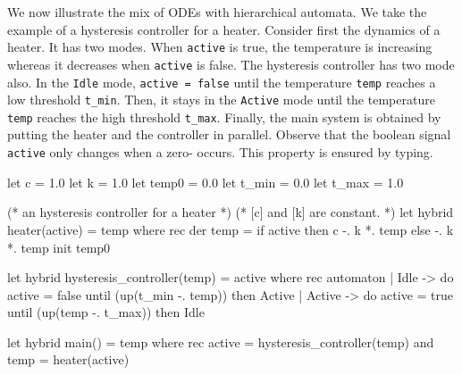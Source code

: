\documentclass[11pt,titlepage,twoside]{report}
\newcommand{\Marc}[1]{{\bf Marc.} {#1} {\bf Fin}}
\begin{document}
We now illustrate the mix of \acp{ODE} with hierarchical automata. We take
the example of a hysteresis controller for a heater.  Consider first
the dynamics of a heater. It has two modes. When \texttt{active} is true,
the temperature is increasing whereas it decreases when
\texttt{active} is false. The hysteresis controller has two mode also. In the
\texttt{Idle} mode, \texttt{active = false} until the temperature
\texttt{temp} reaches a low threshold \verb-t_min-. Then, it stays in
the \texttt{Active} mode until the temperature \verb-temp- reaches the
high threshold \verb-t_max-. Finally, the main system is obtained by
putting the heater and the controller in parallel. Observe that the
boolean signal \verb-active- only changes when a zero-
occurs. This property is ensured by typing.







\begin{runverbatim}
let c = 1.0
let k = 1.0
let temp0 = 0.0
let t_min = 0.0
let t_max = 1.0
\end{runverbatim}
\begin{runverbatim}[continue]
(* an hysteresis controller for a heater *)
(* [c] and [k] are constant. *)
let hybrid heater(active) = temp where
  rec der temp = if active then c -. k *. temp else -. k *. temp init temp0

let hybrid hysteresis_controller(temp) = active where
  rec automaton
      | Idle -> do active = false until (up(t_min -. temp)) then Active
      | Active -> do active = true until (up(temp -. t_max)) then Idle
 
let hybrid main() = temp where
  rec active = hysteresis_controller(temp)
  and temp = heater(active)
\end{runverbatim}
\end{document}
